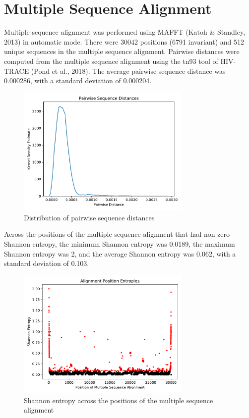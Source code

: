 \documentclass{article}
\begin{document}
\section{Multiple Sequence Alignment}
Multiple sequence alignment was performed using MAFFT (Katoh \& Standley, 2013) in automatic mode.
There were 30042 positions (6791 invariant) and 512 unique sequences in the multiple sequence alignment.
Pairwise distances were computed from the multiple sequence alignment using the tn93 tool of HIV-TRACE (Pond et al., 2018).
The average pairwise sequence distance was 0.000286,
with a standard deviation of 0.000204.


\begin{figure}[h]
\centering
\includegraphics[width=0.75\textwidth,keepaspectratio]{./figs/pairwise_distances_sequences.pdf}
\caption{Distribution of pairwise sequence distances}
\end{figure}

Across the positions of the multiple sequence alignment that had non-zero Shannon entropy,
the minimum Shannon entropy was 0.0189,
the maximum Shannon entropy was 2,
and the average Shannon entropy was 0.062,
with a standard deviation of 0.103.


\begin{figure}[h]
\centering
\includegraphics[width=0.75\textwidth,keepaspectratio]{./figs/alignment_entropies.pdf}
\caption{Shannon entropy across the positions of the multiple sequence alignment}
\end{figure}
\end{document}
